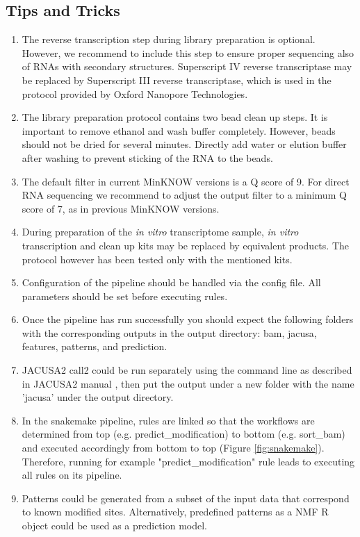 \documentclass[times, 11pt, a4paper]{article}
\begin{document}
\subsection*{Tips and Tricks}
\begin{enumerate}
\item The reverse transcription step during library preparation is optional. However, we recommend to include this step to ensure proper sequencing also of RNAs with secondary structures. Superscript IV reverse transcriptase may be replaced by Superscript III reverse transcriptase, which is used in the protocol provided by Oxford Nanopore Technologies.

\item The library preparation protocol contains two bead clean up steps. It is important to remove ethanol and wash buffer completely. However, beads should not be dried for several minutes. Directly add water or elution buffer after washing to prevent sticking of the RNA to the beads.

\item The default filter in current MinKNOW versions is a Q score of 9. For direct RNA sequencing we recommend to adjust the output filter to a minimum Q score of 7, as in previous MinKNOW versions.

\item During preparation of the \textit{in vitro} transcriptome sample, \textit{in vitro} transcription and clean up kits may be replaced by equivalent products. The protocol however has been tested only with the mentioned kits.

\item Configuration of the pipeline should be handled via the config file. All parameters should be set before executing rules.

\item Once the pipeline has run successfully you should expect the following folders with the corresponding outputs in the output directory: bam, jacusa, features, patterns, and prediction.

\item JACUSA2 call2 could be run separately using the command line as described in JACUSA2 manual \citep{JACUSA2manual}, then put the output under a new folder with the name 'jacusa' under the output directory.

\item In the snakemake pipeline, rules are linked so that the workflows are determined from top (e.g. predict\_modification) to bottom (e.g. sort\_bam) and executed accordingly from bottom to top (Figure \ref{fig:snakemake}). Therefore, running for example "predict\_modification" rule leads to executing all rules on its pipeline.

\item Patterns could be generated from a subset of the input data that correspond to known modified sites. Alternatively, predefined patterns as a NMF R object could be used as a prediction model.
\end{enumerate}
\end{document}
